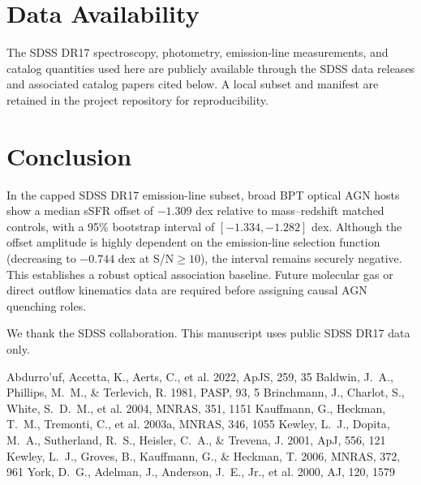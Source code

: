\documentclass[twocolumn]{aastex631}
\begin{document}
\section{Data Availability}\label{sec:data-avail}
The SDSS DR17 spectroscopy, photometry, emission-line measurements, and catalog quantities used here are publicly available through the SDSS data releases and associated catalog papers cited below. A local subset and manifest are retained in the project repository for reproducibility.

\section{Conclusion}\label{sec:conclusion}
In the capped SDSS DR17 emission-line subset, broad BPT optical AGN hosts show a median sSFR offset of $-1.309$ dex relative to mass--redshift matched controls, with a 95\% bootstrap interval of $[-1.334,-1.282]$ dex. Although the offset amplitude is highly dependent on the emission-line selection function (decreasing to $-0.744$ dex at S/N$\geq 10$), the interval remains securely negative. This establishes a robust optical association baseline. Future molecular gas or direct outflow kinematics data are required before assigning causal AGN quenching roles.

\acknowledgments
We thank the SDSS collaboration. This manuscript uses public SDSS DR17 data only.


\begin{thebibliography}{}
 Abdurro'uf, Accetta, K., Aerts, C., et al. 2022, ApJS, 259, 35
 Baldwin, J.~A., Phillips, M.~M., \& Terlevich, R. 1981, PASP, 93, 5
 Brinchmann, J., Charlot, S., White, S.~D.~M., et al. 2004, MNRAS, 351, 1151
 Kauffmann, G., Heckman, T.~M., Tremonti, C., et al. 2003a, MNRAS, 346, 1055
 Kewley, L.~J., Dopita, M.~A., Sutherland, R.~S., Heisler, C.~A., \& Trevena, J. 2001, ApJ, 556, 121
 Kewley, L.~J., Groves, B., Kauffmann, G., \& Heckman, T. 2006, MNRAS, 372, 961
 York, D.~G., Adelman, J., Anderson, J.~E., Jr., et al. 2000, AJ, 120, 1579

\end{thebibliography}
\end{document}
